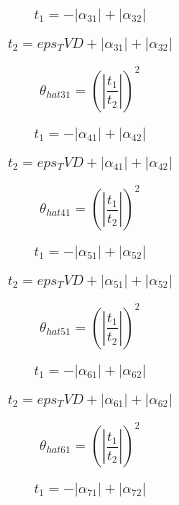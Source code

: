 \documentclass{article}
\begin{document}
\begin{dmath}t_{1} = - \left|{\alpha_{31}}\right| + \left|{\alpha_{32}}\right|\end{dmath}

\begin{dmath}t_{2} = eps_TVD + \left|{\alpha_{31}}\right| + \left|{\alpha_{32}}\right|\end{dmath}

\begin{dmath}\theta_{hat 31} = \left(\left|{\frac{t_{1}}{t_{2}}}\right| \right)^{2}\end{dmath}

\begin{dmath}t_{1} = - \left|{\alpha_{41}}\right| + \left|{\alpha_{42}}\right|\end{dmath}

\begin{dmath}t_{2} = eps_TVD + \left|{\alpha_{41}}\right| + \left|{\alpha_{42}}\right|\end{dmath}

\begin{dmath}\theta_{hat 41} = \left(\left|{\frac{t_{1}}{t_{2}}}\right| \right)^{2}\end{dmath}

\begin{dmath}t_{1} = - \left|{\alpha_{51}}\right| + \left|{\alpha_{52}}\right|\end{dmath}

\begin{dmath}t_{2} = eps_TVD + \left|{\alpha_{51}}\right| + \left|{\alpha_{52}}\right|\end{dmath}

\begin{dmath}\theta_{hat 51} = \left(\left|{\frac{t_{1}}{t_{2}}}\right| \right)^{2}\end{dmath}

\begin{dmath}t_{1} = - \left|{\alpha_{61}}\right| + \left|{\alpha_{62}}\right|\end{dmath}

\begin{dmath}t_{2} = eps_TVD + \left|{\alpha_{61}}\right| + \left|{\alpha_{62}}\right|\end{dmath}

\begin{dmath}\theta_{hat 61} = \left(\left|{\frac{t_{1}}{t_{2}}}\right| \right)^{2}\end{dmath}

\begin{dmath}t_{1} = - \left|{\alpha_{71}}\right| + \left|{\alpha_{72}}\right|\end{dmath}
\end{document}
